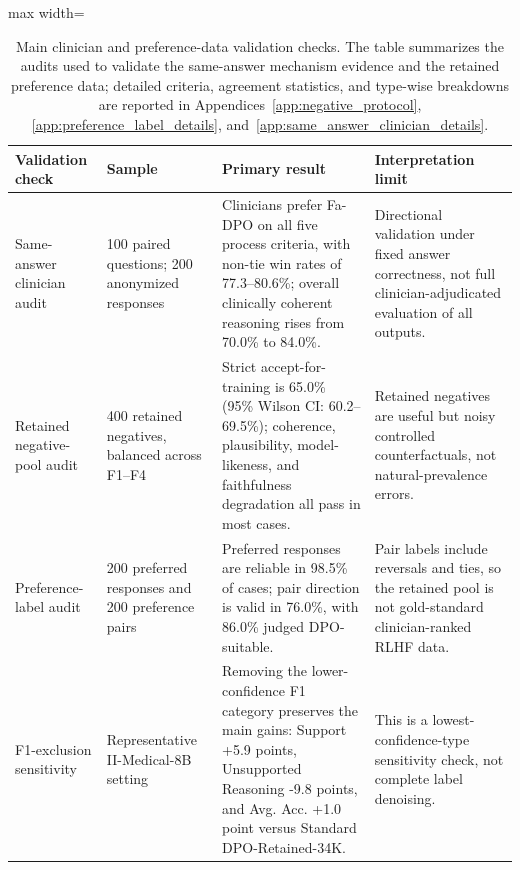 \documentclass[a4paper,fleqn,doubleblind]{cas-sc}
\begin{document}
\begin{table}[!b]
    \centering
    \footnotesize
    \caption{Main clinician and preference-data validation checks. The table summarizes the audits used to validate the same-answer mechanism evidence and the retained preference data; detailed criteria, agreement statistics, and type-wise breakdowns are reported in Appendices~\ref{app:negative_protocol}, \ref{app:preference_label_details}, and~\ref{app:same_answer_clinician_details}.}
    \label{tab:clinician_preference_validation_summary}
    \begin{adjustbox}{max width=\textwidth}
    \begin{tabular}{p{}p{}p{}p{}}
        \toprule
        \textbf{Validation check} & \textbf{Sample} & \textbf{Primary result} & \textbf{Interpretation limit} \\
        \midrule
        Same-answer clinician audit & 100 paired questions; 200 anonymized responses & Clinicians prefer Fa-DPO on all five process criteria, with non-tie win rates of 77.3--80.6\%; overall clinically coherent reasoning rises from 70.0\% to 84.0\%. & Directional validation under fixed answer correctness, not full clinician-adjudicated evaluation of all outputs. \\
        Retained negative-pool audit & 400 retained negatives, balanced across F1--F4 & Strict accept-for-training is 65.0\% (95\% Wilson CI: 60.2--69.5\%); coherence, plausibility, model-likeness, and faithfulness degradation all pass in most cases. & Retained negatives are useful but noisy controlled counterfactuals, not natural-prevalence errors. \\
        Preference-label audit & 200 preferred responses and 200 preference pairs & Preferred responses are reliable in 98.5\% of cases; pair direction is valid in 76.0\%, with 86.0\% judged DPO-suitable. & Pair labels include reversals and ties, so the retained pool is not gold-standard clinician-ranked RLHF data. \\
        F1-exclusion sensitivity & Representative II-Medical-8B setting & Removing the lower-confidence F1 category preserves the main gains: Support +5.9 points, Unsupported Reasoning -9.8 points, and Avg. Acc. +1.0 point versus Standard DPO-Retained-34K. & This is a lowest-confidence-type sensitivity check, not complete label denoising. \\
        \bottomrule
    \end{tabular}
    \end{adjustbox}
\end{table}
\end{document}
